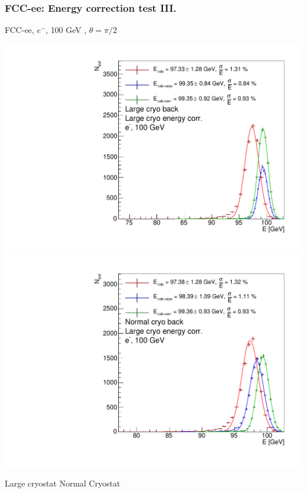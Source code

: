 \documentclass{beamer}
\newcommand{\redtext}[1]{%
  \textcolor{myRed}{#1}
}
\begin{document}
\begin{frame}
  \frametitle{FCC-ee: Energy correction test III.}

  \centering
  FCC-ee, $e^{-}$, \redtext{100 GeV}, $\theta = \pi/2$ \\[1.5ex]
  \begin{adjustwidth}{-9mm}{-9mm}
    \includegraphics[width=0.49\linewidth]{figures/energy_corr/large_cryo__large_cryo_corr/sums_large_cryo__large_cryo_corr_90deg_100gev.pdf}
    \includegraphics[width=0.49\linewidth]{figures/energy_corr/normal_cryo__large_cryo_corr/sums_normal_cryo__large_cryo_corr_90deg_100gev.pdf}
  \end{adjustwidth}
  Large cryostat \hspace{4cm} Normal Cryostat
\end{frame}
\end{document}

